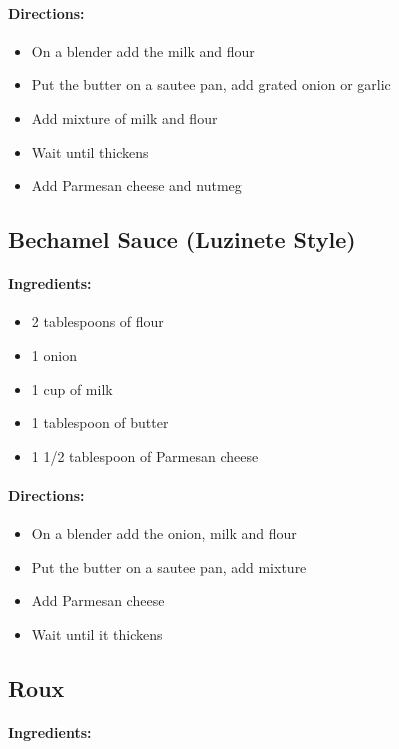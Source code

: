 \documentclass{article}
\begin{document}
\paragraph{Directions:}
\begin{itemize}
	\item On a blender add the milk and flour
	\item Put the butter on a sautee pan, add grated onion or garlic
	\item Add mixture of milk and flour
	\item Wait until thickens
	\item Add Parmesan cheese and nutmeg
\end{itemize}

\subsection{Bechamel Sauce (Luzinete Style)}

\paragraph{Ingredients:}

\begin{itemize}
	\item 2 tablespoons of flour
	\item 1 onion
	\item 1 cup of milk
	\item 1 tablespoon of butter
	\item 1 1/2 tablespoon of Parmesan cheese
\end{itemize}

\paragraph{Directions:}
\begin{itemize}
	\item On a blender add the onion, milk and flour
	\item Put the butter on a sautee pan, add mixture
	\item Add Parmesan cheese
	\item Wait until it thickens
\end{itemize}

\subsection{Roux}

\paragraph{Ingredients:}
\end{document}
